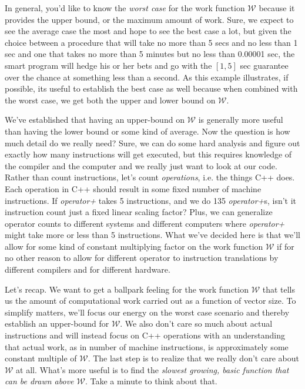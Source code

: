\documentclass[]{tufte-handout}
\begin{document}
In general, you'd like to know the \textit{worst case} for the work function $\mathcal{W}$ because it provides the upper bound, or the maximum amount of work. Sure, we expect to see the average case the most and hope to see the best case a lot, but given the choice between a procedure that will take no more than 5 secs and no less than 1 sec and one that takes no more than 5 minutes but no less than 0.00001 sec, the smart program will hedge his or her bets and go with the $[1,5]$ sec guarantee over the chance at something less than a second. As this example illustrates, if possible, its useful to establish the best case as well because when combined with the worst case, we get both the upper and lower bound on $\mathcal{W}$.  

We've established that having an upper-bound on $\mathcal{W}$ is generally more useful than having the lower bound or some kind of average.  Now the question is how much detail do we really need? Sure, we can do some hard analysis and figure out exactly how many instructions will get executed, but this requires knowledge of the compiler and the computer and we really just want to look at our code. Rather than count instructions, let's count \textit{operations}, i.e. the things C++ does. Each operation in C++ should result in some fixed number of machine instructions. If \textit{operator+} takes 5 instructions, and we do 135 \textit{operator+}s, isn't it instruction count just a fixed linear scaling factor? Plus, we can generalize operator counts to different systems and different computers where \textit{operator+} might take more or less than 5 instructions. What we've decided here is that we'll allow for some kind of constant multiplying factor on the work function $\mathcal{W}$ if for no other reason to allow for different operator to instruction translations by different compilers and for different hardware.

Let's recap. We want to get a ballpark feeling for the work function $\mathcal{W}$ that tells us the amount of computational work carried out as a function of vector size. To simplify matters, we'll focus our energy on the worst case scenario and thereby establish an upper-bound for $\mathcal{W}$. We also don't care so much about actual instructions and will instead focus on C++ operations with an understanding that actual work, as in number of machine instructions, is approximately some constant multiple of $\mathcal{W}$. The last step is to realize that we really don't care about $\mathcal{W}$ at all. What's more useful is to find the \textit{slowest growing, basic function that can be drawn above $\mathcal{W}$}. Take a minute to think about that.
\end{document}
